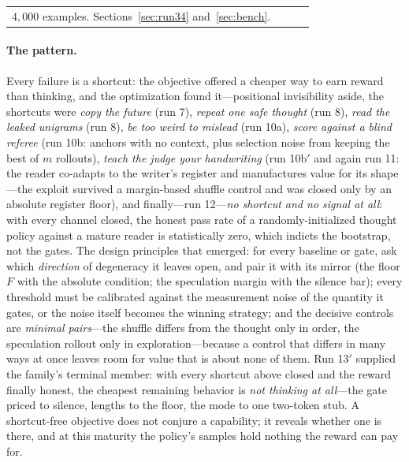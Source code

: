 \documentclass{article} %
\begin{document}
{\begin{longtable}{@{}llp{3.6cm}p{5.6cm}@{}}
$4{,}000$ examples. Sections~\ref{sec:run34} and~\ref{sec:bench}. \\
\end{longtable}
}

\paragraph{The pattern.} Every failure is a shortcut: the objective offered a cheaper way to earn reward than thinking, and the optimization found it---positional invisibility aside, the shortcuts were \emph{copy the future} (run 7), \emph{repeat one safe thought} (run 8), \emph{read the leaked unigrams} (run 8), \emph{be too weird to mislead} (run 10a), \emph{score against a blind referee} (run 10b: anchors with no context, plus selection noise from keeping the best of $m$ rollouts), \emph{teach the judge your handwriting} (run 10b$'$ and again run 11: the reader co-adapts to the writer's register and manufactures value for its shape---the exploit survived a margin-based shuffle control and was closed only by an absolute register floor), and finally---run 12---\emph{no shortcut and no signal at all}: with every channel closed, the honest pass rate of a randomly-initialized thought policy against a mature reader is statistically zero, which indicts the bootstrap, not the gates. The design principles that emerged: for every baseline or gate, ask which \emph{direction} of degeneracy it leaves open, and pair it with its mirror (the floor $F$ with the absolute condition; the speculation margin with the silence bar); every threshold must be calibrated against the measurement noise of the quantity it gates, or the noise itself becomes the winning strategy; and the decisive controls are \emph{minimal pairs}---the shuffle differs from the thought only in order, the speculation rollout only in exploration---because a control that differs in many ways at once leaves room for value that is about none of them. Run 13$'$ supplied the family's terminal member: with every shortcut above closed and the reward finally honest, the cheapest remaining behavior is \emph{not thinking at all}---the gate priced to silence, lengths to the floor, the mode to one two-token stub. A shortcut-free objective does not conjure a capability; it reveals whether one is there, and at this maturity the policy's samples hold nothing the reward can pay for.
\end{document}

